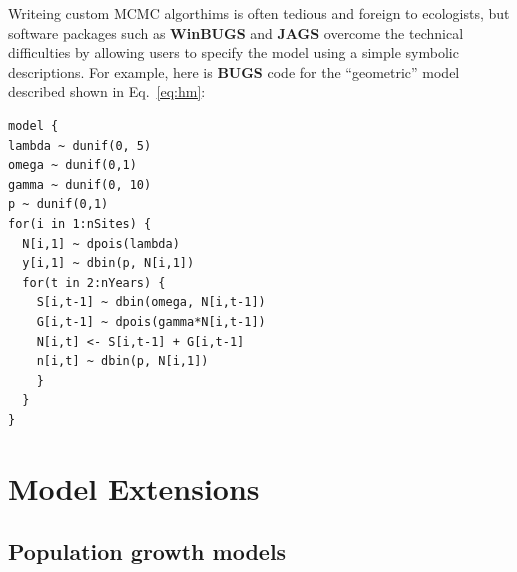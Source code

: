 \documentclass[12pt]{article}
\begin{document}
Writeing custom MCMC algorthims is often tedious and foreign to
ecologists, but software packages such as \textbf{WinBUGS} and
\textbf{JAGS} overcome the technical difficulties by allowing users to
specify the model using a simple symbolic descriptions. For example,
here is \textbf{BUGS} code for the ``geometric'' model described shown
in Eq.~\ref{eq:hm}:
\begin{verbatim}
model {
lambda ~ dunif(0, 5)
omega ~ dunif(0,1)
gamma ~ dunif(0, 10)
p ~ dunif(0,1)
for(i in 1:nSites) {
  N[i,1] ~ dpois(lambda)
  y[i,1] ~ dbin(p, N[i,1])
  for(t in 2:nYears) {
    S[i,t-1] ~ dbin(omega, N[i,t-1])
    G[i,t-1] ~ dpois(gamma*N[i,t-1])
    N[i,t] <- S[i,t-1] + G[i,t-1]
    n[i,t] ~ dbin(p, N[i,1])
    }
  }
}
\end{verbatim}



\section{Model Extensions}
\label{sec:ext}

\subsection{Population growth models}

\end{document}
